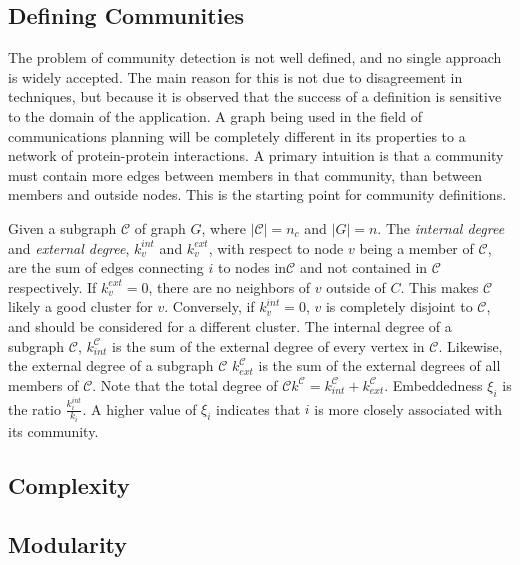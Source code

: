 \subsection{Defining Communities}

The problem of community detection is not well defined, and no single approach is widely accepted. The main reason for this is not due to disagreement in techniques, but because it is observed that the success of a definition is sensitive to the domain of the application. A graph being used in the field of communications planning will be completely different in its properties to a network of protein-protein interactions. A primary intuition is that a community must contain more edges between members in that community, than between members and outside nodes. This is the starting point for community definitions. 

Given a subgraph $\mathcal{C}$ of graph $G$, where $|\mathcal{C}|= n_c$ and $|G|=n$. The \textit{internal degree} and \textit{external degree}, $k^{int}_v$ and $k^{ext}_v$, with respect to node $v$ being a member of $\mathcal{C}$, are the sum of edges connecting $i$ to nodes in$\mathcal{C}$ and not contained in $\mathcal{C}$ respectively. If $k^{ext}_v=0$, there are no neighbors of $v$ outside of $C$. This makes $\mathcal{C}$ likely a good cluster for $v$. Conversely, if $k^{int}_v=0$, $v$ is completely disjoint to $\mathcal{C}$, and should be considered for a different cluster. The internal degree of a subgraph $\mathcal{C}$, $k^{\mathcal{C}}_{int}$ is the sum of the external degree of every vertex in $\mathcal{C}$. Likewise, the external degree of a subgraph $\mathcal{C}$ $k^{\mathcal{C}}_{ext}$ is the sum of the external degrees of all members of $\mathcal{C}$. Note that the total degree of $\mathcal{C}k^\mathcal{C}=k^{\mathcal{C}}_{int}+k^{\mathcal{C}}_{ext}$.
Embeddedness $\xi_i$ is the ratio $\frac{k^{int}_i}{k_i}$. A higher value of $\xi_i$ indicates that $i$ is more closely associated with its community.   


\subsection{Complexity}


\subsection{Modularity}



